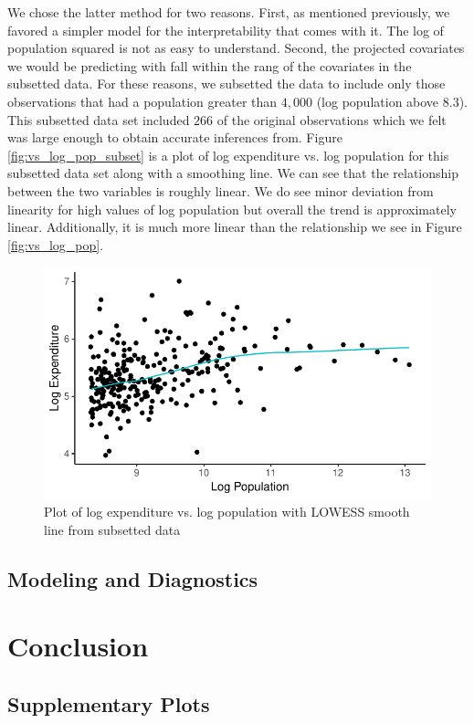 \documentclass{article}\usepackage[]{graphicx}\usepackage[]{color}
\makeatletter
\def\maxwidth{ %
  \ifdim\Gin@nat@width>\linewidth
    \linewidth
  \else
    \Gin@nat@width
  \fi
}
\newenvironment{knitrout}{}{} %
\makeatother
\begin{document}
We chose the latter method for two reasons. First, as mentioned previously, we favored a simpler model for the interpretability that comes with it. The log of population squared is not as easy to understand. Second, the projected covariates we would be predicting with fall within the rang of the covariates in the subsetted data. For these reasons, we subsetted the data to include only those observations that had a population greater than $4,000$ (log population above $8.3$). This subsetted data set included $266$ of the original observations which we felt was large enough to obtain accurate inferences from. Figure \ref{fig:vs_log_pop_subset} is a plot of log expenditure vs. log population for this subsetted data set along with a smoothing line. We can see that the relationship between the two variables is roughly linear. We do see minor deviation from linearity for high values of log population but overall the trend is approximately linear. Additionally, it is much more linear than the relationship we see in Figure \ref{fig:vs_log_pop}.

\begin{knitrout}
\color{fgcolor}\begin{figure}[h]
\includegraphics[width=\maxwidth]{figure/r_fig_vs_log_pop_subset-1} \caption{\label{fig:vs_log_pop_subset} Plot of log expenditure vs. log population with LOWESS smooth line from subsetted data}\label{fig:r fig_vs_log_pop_subset}
\end{figure}


\end{knitrout}

\subsection{Modeling and Diagnostics} \label{modeling}

\section{Conclusion} \label{conclusion}



\newpage
\begin{appendices}

\section{Supplementary Plots} \label{appendix_plots}

\end{appendices}
\end{document}
